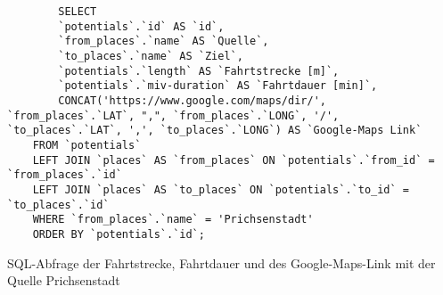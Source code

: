 \begin{listing}[htbp]
    \begin{verbatim}
        SELECT 
        `potentials`.`id` AS `id`, 
        `from_places`.`name` AS `Quelle`,
        `to_places`.`name` AS `Ziel`, 
        `potentials`.`length` AS `Fahrtstrecke [m]`, 
        `potentials`.`miv-duration` AS `Fahrtdauer [min]`,
        CONCAT('https://www.google.com/maps/dir/', `from_places`.`LAT`, ",", `from_places`.`LONG`, '/', `to_places`.`LAT`, ',', `to_places`.`LONG`) AS `Google-Maps Link`
    FROM `potentials`
    LEFT JOIN `places` AS `from_places` ON `potentials`.`from_id` = `from_places`.`id`
    LEFT JOIN `places` AS `to_places` ON `potentials`.`to_id` = `to_places`.`id`
    WHERE `from_places`.`name` = 'Prichsenstadt'
    ORDER BY `potentials`.`id`;
    \end{verbatim}
    \caption{SQL-Abfrage der Fahrtstrecke, Fahrtdauer und des Google-Maps-Link mit der Quelle Prichsenstadt}\label{lst-f-prichsenstadt}
\end{listing}